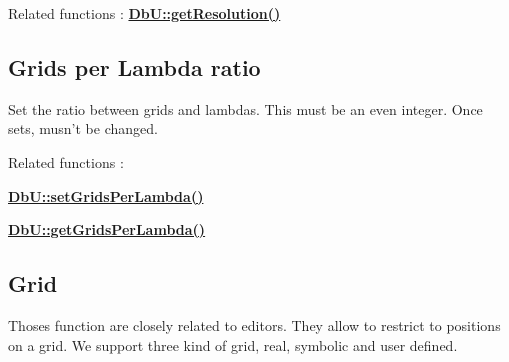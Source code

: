 Related functions \-: {\bfseries \hyperlink{group__DbUGroup_ga120a60b09b344d01c583567a1e489d9e}{Db\-U\-::get\-Resolution()}}\hypertarget{group__DbUGroup_secDbUGridsPerLamba}{}\subsection{Grids per Lambda ratio}\label{group__DbUGroup_secDbUGridsPerLamba}
Set the ratio between grids and lambdas. This must be an even integer. Once sets, musn't be changed.

Related functions \-: 
\begin{DoxyItemize}
\item {\bfseries \hyperlink{group__DbUGroup_gac93f9ba2a09105227e34bd05bcb1500c}{Db\-U\-::set\-Grids\-Per\-Lambda()}} 
\item {\bfseries \hyperlink{group__DbUGroup_ga9a0359adbfafc356326f5c6adf57ff04}{Db\-U\-::get\-Grids\-Per\-Lambda()}} 
\end{DoxyItemize}\hypertarget{group__DbUGroup_secDbUGrid}{}\subsection{Grid}\label{group__DbUGroup_secDbUGrid}
Thoses function are closely related to editors. They allow to restrict to positions on a grid. We support three kind of grid, real, symbolic and user defined.


